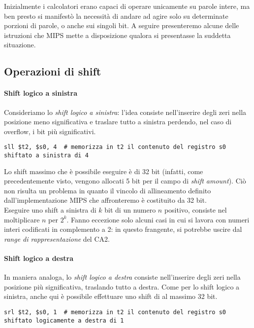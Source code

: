 Inizialmente i calcolatori erano capaci di operare unicamente su parole intere, ma ben presto si manifestò la necessità di andare ad agire solo su determinate porzioni di parole, o anche sui singoli bit. A seguire presenteremo alcune delle istruzioni che MIPS mette a disposizione qualora si presentasse la suddetta situazione.

\subsection{Operazioni di shift}

\paragraph{Shift logico a sinistra}
Consideriamo lo \emph{shift logico a sinistra}: l'idea consiste nell'inserire degli zeri nella posizione meno significativa e traslare tutto a sinistra perdendo, nel caso di overflow, i bit più significativi.

\begin{verbatim}
sll $t2, $s0, 4  # memorizza in t2 il contenuto del registro s0 shiftato a sinistra di 4
\end{verbatim}

Lo shift massimo che è possibile eseguire è di 32 bit (infatti, come precedentemente visto, vengono allocati 5 bit per il campo di \emph{shift amount}). Ciò non risulta un problema in quanto il vincolo di allineamento definito dall'implementazione MIPS che affronteremo è costituito da 32 bit.\\
Eseguire uno shift a sinistra di \(k\) bit di un numero \(n\) positivo, consiste nel moltiplicare \(n\) per \(2^k\). Fanno eccezione solo alcuni casi in cui si lavora con numeri interi codificati in complemento a 2: in questo frangente, si potrebbe uscire dal \emph{range di rappresentazione} del CA2.

\paragraph{Shift logico a destra}
In maniera analoga, lo \emph{shift logico a destra} consiste nell'inserire degli zeri nella posizione più significativa, traslando tutto a destra. Come per lo shift logico a sinistra, anche qui è possibile effettuare uno shift di al massimo 32 bit.

\begin{verbatim}
srl $t2, $s0, 1  # memorizza in t2 il contenuto del registro s0 shiftato logicamente a destra di 1
\end{verbatim}

